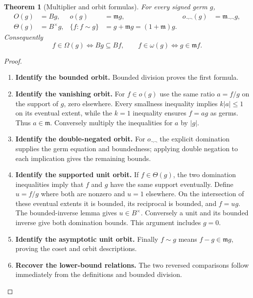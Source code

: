 \documentclass[11pt,a4paper]{article}
\numberwithin{algorithm}{section}
\numberwithin{equation}{section}
\newtheorem{theorem}{Theorem}[section]
\theoremstyle{definition}
\theoremstyle{remark}
\theoremstyle{plain}
\newcommand{\abs}[1]{\lvert #1\rvert}
\newcommand{\onn}{o_{\neg\neg}}
\theoremstyle{definition}
\theoremstyle{plain}
\begin{document}
\begin{theorem}[Multiplier and orbit formulas]\label{thm:orbits}
For every signed germ $g$,
\[
\begin{aligned}
 O(g)&=Bg,& o(g)&=\mathfrak m g,&
 \onn(g)&=\mathfrak m_{\neg\neg}g,\\
 \Theta(g)&=B^\times g,&
 \{f:f\sim g\}&=g+\mathfrak m g=(1+\mathfrak m)g.
\end{aligned}
\]
Consequently
\[
 f\in\Omega(g)\iff Bg\subseteq Bf,\qquad
 f\in\omega(g)\iff g\in\mathfrak m f.
\]
\end{theorem}
\begin{proof}\leavevmode
\begin{enumerate}[leftmargin=*,align=left]
\item \textbf{Identify the bounded orbit.}
Bounded division proves the first formula.

\item \textbf{Identify the vanishing orbit.}
For $f\in o(g)$
use the same ratio $a=f/g$ on the support of $g$, zero
elsewhere. Every smallness inequality implies
$k\abs a\le1$ on its eventual extent, while the $k=1$
inequality ensures $f=ag$ as germs. Thus $a\in\mathfrak m$.
Conversely multiply the inequalities for $a$ by $\abs g$.

\item \textbf{Identify the double-negated orbit.}
For $\onn$ the explicit domination supplies the germ equation
and boundedness; applying double negation to each implication
gives the remaining bounds.

\item \textbf{Identify the supported unit orbit.}
If $f\in\Theta(g)$, the two domination inequalities imply that
$f$ and $g$ have the same support eventually. Define $u=f/g$
where both are nonzero and $u=1$ elsewhere. On the intersection
of these eventual extents it is bounded, its reciprocal is
bounded, and $f=ug$. The bounded-inverse lemma gives $u\in B^\times$.
Conversely a unit and its bounded inverse give both domination
bounds. This argument includes $g=0$.

\item \textbf{Identify the asymptotic unit orbit.}
Finally $f\sim g$ means $f-g\in\mathfrak m g$, proving the
coset and orbit descriptions.

\item \textbf{Recover the lower-bound relations.}
The two reversed comparisons
follow immediately from the definitions and bounded division.
\end{enumerate}
\end{proof}
\end{document}
